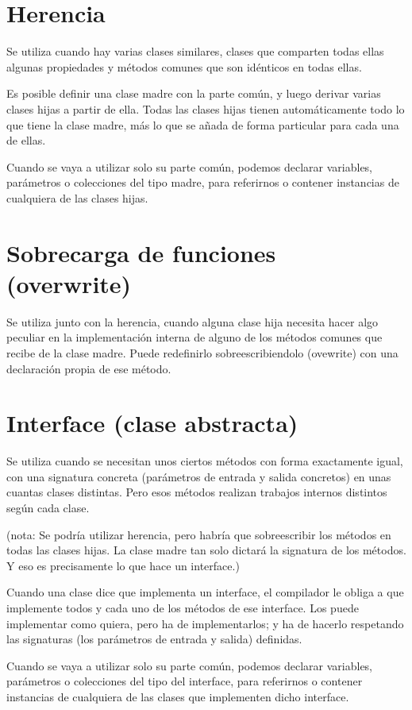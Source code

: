 \documentclass[spanish,12pt,a4paper,final,oneside]{book}
\begin{document}
\section{Herencia}
Se utiliza cuando hay varias clases similares, clases que comparten todas ellas algunas propiedades y métodos comunes que son idénticos en todas ellas. 

Es posible definir una clase madre con la parte común, y luego derivar varias clases hijas a partir de ella. Todas las clases hijas tienen automáticamente todo lo que tiene la clase madre, más lo que se añada de forma particular para cada una de ellas.

Cuando se vaya a utilizar solo su parte común, podemos declarar variables, parámetros o colecciones del tipo madre, para referirnos o contener instancias de cualquiera de las clases hijas.

\section{Sobrecarga de funciones (overwrite)}
Se utiliza junto con la herencia, cuando alguna clase hija necesita hacer algo peculiar en la implementación interna de alguno de los métodos comunes que recibe de la clase madre. Puede redefinirlo sobreescribiendolo (ovewrite) con una declaración propia de ese método. 

\section{Interface (clase abstracta)}
Se utiliza cuando se necesitan unos ciertos métodos con forma exactamente igual, con una signatura concreta (parámetros de entrada y salida concretos) en unas cuantas clases distintas. Pero esos métodos realizan trabajos internos distintos según cada clase.

(nota: Se podría utilizar herencia, pero habría que sobreescribir los métodos en todas las clases hijas. La clase madre tan solo dictará la signatura de los métodos. Y eso es precisamente lo que hace un interface.)

Cuando una clase dice que implementa un interface, el compilador le obliga a que implemente todos y cada uno de los métodos de ese interface. Los puede implementar como quiera, pero ha de implementarlos; y ha de hacerlo respetando las signaturas (los parámetros de entrada y salida) definidas.

Cuando se vaya a utilizar solo su parte común, podemos declarar variables, parámetros o colecciones del tipo del interface, para referirnos o contener instancias de cualquiera de las clases que implementen dicho interface.
\end{document}

